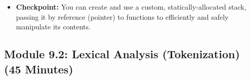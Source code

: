 \documentclass[11pt,a4paper]{article}
\begin{document}
\begin{itemize}
\begin{lstlisting}[caption={Code for Module 9.1: A Memory-Safe Static Stack}]
// Push a value onto the stack.
// Returns 0 on success, -1 on failure (stack full).
int fstack_push(FloatStack *s, float value) {
    if (s->top >= STACK_SIZE - 1) {
        return -1; // Error: Stack Overflow
    }
    s->data[++s->top] = value;
    return 0;
}

// Pop a value from the stack.
// Returns the value, or 0.0f if the stack was empty.
float fstack_pop(FloatStack *s) {
    if (s->top < 0) {
        return 0.0f; // Error: Stack Underflow
    }
    return s->data[s->top--];
}

int main(void) {
    // Instantiate the stack. It lives on the main() call stack.
    FloatStack my_stack;
    
    // Pass a POINTER to the stack to our functions.
    // This is efficient; we don't copy the whole 32-element array.
    fstack_init(&my_stack);
    
    fstack_push(&my_stack, 3.14f);
    fstack_push(&my_stack, 1.618f);
    
    // float val = fstack_pop(&my_stack); // val is now 1.618f
    
    while(1) {}
    return 0;
}
\end{lstlisting}
    \item \textbf{Checkpoint:} You can create and use a custom, statically-allocated stack, passing it by reference (pointer) to functions to efficiently and safely manipulate its contents.
\end{itemize}
\newpage
\subsection*{Module 9.2: Lexical Analysis (Tokenization) (45 Minutes)}
\end{document}
